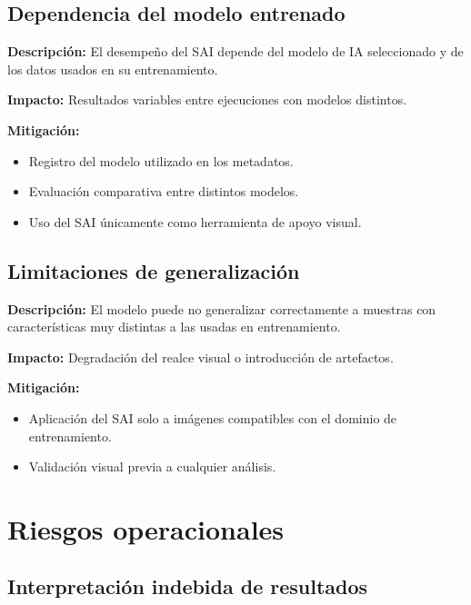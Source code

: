 \subsection{Dependencia del modelo entrenado}

\textbf{Descripción:}  
El desempeño del SAI depende del modelo de IA seleccionado y de los datos usados
en su entrenamiento.

\textbf{Impacto:}  
Resultados variables entre ejecuciones con modelos distintos.

\textbf{Mitigación:}
\begin{itemize}
    \item Registro del modelo utilizado en los metadatos.
    \item Evaluación comparativa entre distintos modelos.
    \item Uso del SAI únicamente como herramienta de apoyo visual.
\end{itemize}

\subsection{Limitaciones de generalización}

\textbf{Descripción:}  
El modelo puede no generalizar correctamente a muestras con características muy
distintas a las usadas en entrenamiento.

\textbf{Impacto:}  
Degradación del realce visual o introducción de artefactos.

\textbf{Mitigación:}
\begin{itemize}
    \item Aplicación del SAI solo a imágenes compatibles con el dominio de
    entrenamiento.
    \item Validación visual previa a cualquier análisis.
\end{itemize}

\section{Riesgos operacionales}

\subsection{Interpretación indebida de resultados}

